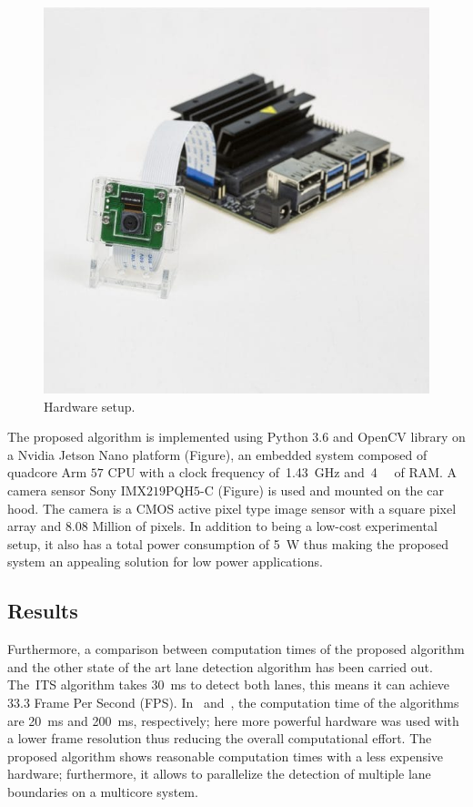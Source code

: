 \begin{figure}[ht]
	\centering
	\includegraphics[scale=0.4]{figure/Part1/Chapter4/figures/setup.jpg}
	\caption{Hardware setup.}
	\label{fig:setup}
\end{figure}

The proposed algorithm is implemented using Python $3.6$ and OpenCV library on a Nvidia Jetson Nano platform (Figure), an embedded system composed of quadcore Arm $57$ CPU with a clock frequency of~\SI{1.43}{\GHz} and~\SI{4}{\giga \byte} of RAM. A camera sensor Sony IMX$219$PQH$5$-C (Figure) is used and mounted on the car hood. The camera is a CMOS active pixel type image sensor with a square pixel array and $8.08$ Million of pixels. In addition to being a low-cost experimental setup, it also has a total power consumption of \SI{5}{\watt} thus making the proposed system an appealing solution for low power applications. 


\subsection{Results}


Furthermore, a comparison between computation times of the proposed algorithm and the other state of the art lane detection algorithm has been carried out. The~\gls{ITS} algorithm takes 
\SI{30}{\milli \second} to detect both lanes, this means it can achieve 33.3 Frame Per Second (FPS).
In~\cite{aly2008real} and~\cite{liu2013lane}, the computation time of the algorithms are \SI{20}{\milli\second} and \SI{200}{\milli\second}, respectively; here more powerful hardware was used with a lower frame resolution thus reducing the overall computational effort. The proposed algorithm shows reasonable computation times with a less expensive hardware; furthermore, it allows to parallelize the detection of multiple lane boundaries on a multicore system. 


